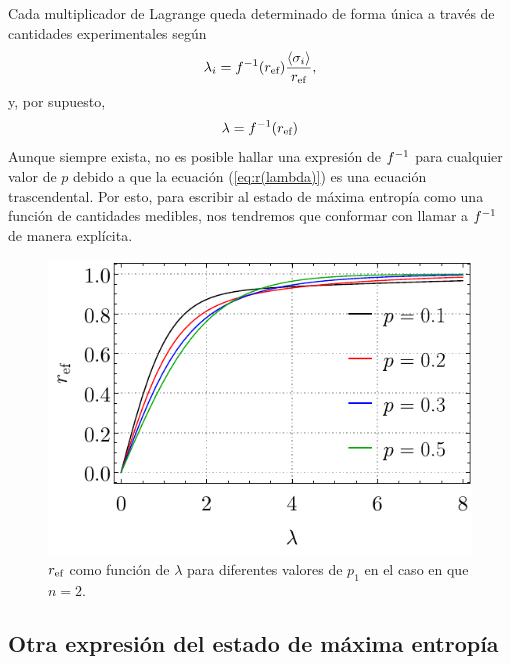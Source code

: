 Cada multiplicador de Lagrange queda determinado de forma única a través de cantidades experimentales según 
\begin{equation}
    \lambda_{i}=f^{-1}(r_{\text{ef}}) \frac{\expval{\sigma_{i}}}{r_{\text{ef}}},
\end{equation}
y, por supuesto,
\begin{equation}
    \lambda=f^{-1}(r_{\text{ef}})\nonumber
\end{equation}
Aunque siempre exista, no es posible hallar una expresión de $f^{-1}$ para cualquier valor de $p$ debido a que la ecuación (\ref{eq:r(lambda)}) es una ecuación trascendental. Por esto, para escribir al estado de máxima entropía como una función de cantidades medibles, nos tendremos que conformar con llamar a $f^{-1}$ de manera explícita.
\begin{figure}[ht!]
    \centering
    \includegraphics[width=0.5\linewidth]{chapter3/figures/r(lambda).pdf}
    \caption{$r_{\text{ef}}$ como función de $\lambda$ para diferentes valores de $p_{1}$ en el caso en que $n=2$.}
    \label{fig:r(lambda)}
\end{figure}

\subsection{Otra expresión del estado de máxima entropía}


